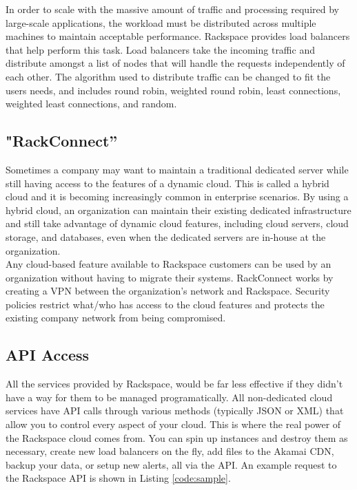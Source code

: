 \documentclass[DIV=calc, paper=letter, fontsize=12pt, twocolumn]{scrartcl}	 %
\begin{document}
In order to scale with the massive amount of traffic and processing
required by large-scale applications, the workload must be distributed
across multiple machines to maintain acceptable performance. Rackspace
provides load balancers that help perform this task. Load balancers
take the incoming traffic and distribute amongst a list of nodes that
will handle the requests independently of each other. The algorithm
used to distribute traffic can be changed to fit the users needs, and
includes round robin, weighted round robin, least connections, weighted
least connections, and random.

\subsection*{"RackConnect''}

Sometimes a company may want to maintain a traditional dedicated server
while still having access to the features of a dynamic cloud. This is
called a hybrid cloud and it is becoming increasingly common in enterprise
scenarios. By using a hybrid cloud, an organization can maintain their
existing dedicated infrastructure and still take advantage of dynamic
cloud features, including cloud servers, cloud storage, and databases,
even when the dedicated servers are in-house at the organization.
\\
Any cloud-based feature available to Rackspace customers can be used
by an organization without having to migrate their systems. RackConnect 
works by creating a VPN between the organization's network and Rackspace.
Security policies restrict what/who has access to the cloud features
and protects the existing company network from being compromised.

\subsection*{API Access}

All the services provided by Rackspace, would be far less effective if 
they didn't have a way for them to be managed programatically. All 
non-dedicated cloud services have API calls through various methods
(typically JSON or XML) that allow you to control every aspect of 
your cloud. This is where the real power of the Rackspace cloud
comes from. You can spin up instances and destroy them as necessary,
create new load balancers on the fly, add files to the Akamai CDN, 
backup your data, or setup new alerts, all via the API. An example request
to the Rackspace API is shown in Listing \ref{code:sample}.
\end{document}

